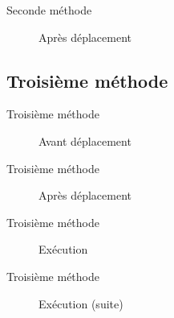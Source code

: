 \begin{frame}{Seconde méthode}
	\begin{figure}[h!]
		\centering
		\resizebox{11cm}{!}{}
		\caption{Après déplacement}
		\label{fig:deplacementMethode2-2}
	\end{figure}
\end{frame}

\subsection{Troisième méthode}
\begin{frame}{Troisième méthode}
	\begin{figure}[h!]
		\centering
		
		\caption{Avant déplacement}
		\label{fig:deplacementMethode3}
	\end{figure}
\end{frame}

\begin{frame}{Troisième méthode}
	\begin{figure}[h!]
		\centering
		
		\caption{Après déplacement}
		\label{fig:deplacementMethode3-2}
	\end{figure}
\end{frame}

\begin{frame}{Troisième méthode}
	\begin{figure}[h!]
		\centering
		
		\caption{Exécution}
		\label{fig:deplacementMethode3-3}
	\end{figure}
\end{frame}

\begin{frame}{Troisième méthode}
	\begin{figure}[h!]
		\centering
		
		\caption{Exécution (suite)}
		\label{fig:deplacementMethode3-4}
	\end{figure}
\end{frame}

